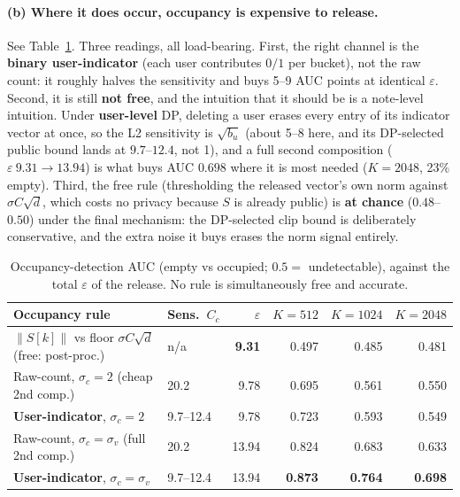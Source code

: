 \documentclass[pdflatex,sn-mathphys-num,iicol]{sn-jnl}
\theoremstyle{thmstyleone}%
\theoremstyle{thmstyletwo}%
\theoremstyle{thmstylethree}%
\newcommand{\eps}{\varepsilon}
\newcommand{\norm}[1]{\left\lVert #1 \right\rVert}
\begin{document}
\paragraph{(b) Where it does occur, occupancy is expensive to release.} See
Table~\ref{tab:occupancy-detect}. Three readings, all load-bearing. First, the right channel is
the \textbf{binary user-indicator} (each user contributes $0/1$ per bucket), not the raw count: it
roughly halves the sensitivity and buys 5--9 AUC points at identical $\eps$. Second, it is still
\textbf{not free}, and the intuition that it should be is a note-level intuition. Under
\textbf{user-level} DP, deleting a user erases every entry of its indicator vector at once, so the
L2 sensitivity is $\sqrt{b_u}$ (about 5--8 here, and its DP-selected public bound lands at
$9.7$--$12.4$, not 1), and a full second composition ($\eps\ 9.31 \to 13.94$) is what buys AUC
$0.698$ where it is most needed ($K = 2048$, 23\% empty). Third, the free rule (thresholding the
released vector's own norm against $\sigma C \sqrt{d}$, which costs no privacy because $S$ is
already public) is \textbf{at chance} ($0.48$--$0.50$) under the final mechanism: the DP-selected
clip bound is deliberately conservative, and the extra noise it buys erases the norm signal
entirely.

\begin{table}[t]
  \centering
  \caption{Occupancy-detection AUC (empty vs occupied; $0.5 =$ undetectable), against the total
  $\eps$ of the release. No rule is simultaneously free and accurate.}
  \label{tab:occupancy-detect}
  \small
  \setlength{\tabcolsep}{4pt}
  \begin{tabular}{@{}llrrrr@{}}
    \toprule
    Occupancy rule & Sens.\ $C_c$ & $\eps$ & $K = 512$ & $K = 1024$ & $K = 2048$ \\
    \midrule
    $\norm{S[k]}$ vs floor $\sigma C \sqrt{d}$ (free: post-proc.) & n/a & \textbf{9.31} & 0.497 & 0.485 & 0.481 \\
    Raw-count, $\sigma_c = 2$ (cheap 2nd comp.)                   & 20.2 & 9.78 & 0.695 & 0.561 & 0.550 \\
    \textbf{User-indicator}, $\sigma_c = 2$                       & 9.7--12.4 & 9.78 & 0.723 & 0.593 & 0.549 \\
    Raw-count, $\sigma_c = \sigma_v$ (full 2nd comp.)             & 20.2 & 13.94 & 0.824 & 0.683 & 0.633 \\
    \textbf{User-indicator}, $\sigma_c = \sigma_v$                & 9.7--12.4 & 13.94 & \textbf{0.873} & \textbf{0.764} & \textbf{0.698} \\
    \bottomrule
  \end{tabular}
\end{table}
\end{document}
